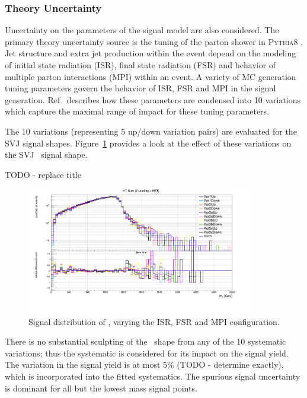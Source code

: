 \subsubsection{Theory Uncertainty}
Uncertainty on the parameters of the signal model are also considered. 
The primary theory uncertainty source is the tuning of the parton shower in \textsc{Pythia8} \cite{parton_shower}. 
Jet structure and extra jet production within the event depend on the modeling of initial state radiation (ISR), final state radiation (FSR) and behavior of multiple parton interactions (MPI) within an event.
A variety of MC generation tuning parameters govern the behavior of ISR, FSR and MPI in the signal generation.
Ref~\cite{pythia8_tunes} describes how these parameters are condensed into 10 variations which capture the maximal range of impact for these tuning parameters. 

The 10 variations (representing 5 up/down variation pairs) are evaluated for the SVJ signal shapes. 
Figure~\ref{fig:isrfsr} provides a look at the effect of these variations on the SVJ \mt~signal shape. 

TODO - replace title
\begin{figure}[!htbp]
\centering
   \includegraphics[width=0.9\textwidth]{figures/systs/isrfsr}
    \caption{Signal distribution of \mt, varying the ISR, FSR and MPI configuration.
    \label{fig:isrfsr}}
\end{figure}

There is no substantial sculpting of the \mt~shape from any of the 10 systematic variations; thus the systematic is considered for its impact on the signal yield.
The variation in the signal yield is at most 5\% (TODO - determine exactly), which is incorporated into the fitted systematics. 
The spurious signal uncertainty is dominant for all but the lowest mass signal points.

